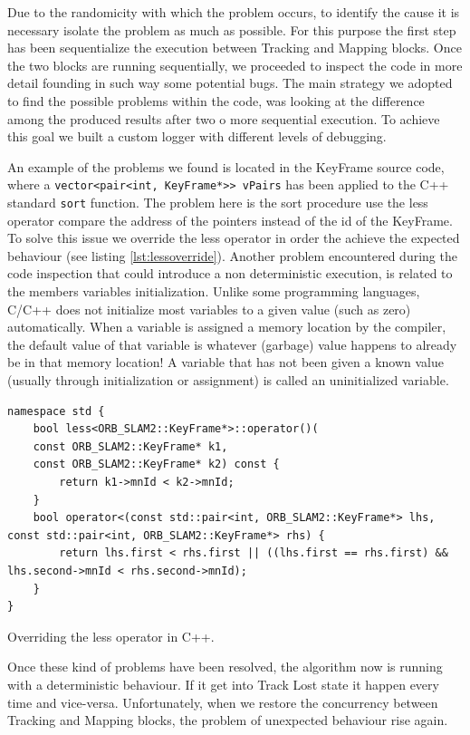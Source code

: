 Due to the randomicity with which the problem occurs, to identify the cause it is necessary isolate the problem as much as possible. For this purpose the first step has been sequentialize the execution between Tracking and Mapping blocks.
Once the two blocks are running sequentially, we proceeded to inspect the code in more detail founding in such way some potential bugs.
The main strategy we adopted to find the possible problems within the code, was looking at the difference among the produced results after two o more sequential execution. To achieve this goal we built a custom logger with different levels of debugging.

An example of the problems we found is located in the KeyFrame source code, where a \texttt{vector<pair<int, KeyFrame*>> vPairs} has been applied to the C++ standard \texttt{sort} function. The problem here is the sort procedure use the less operator compare the address of the pointers instead of the id of the KeyFrame.
To solve this issue we override the less operator in order the achieve the expected behaviour (see listing \ref{lst:lessoverride}).
Another problem encountered during the code inspection that could introduce a non deterministic execution, is related to the members variables initialization.
Unlike some programming languages, C/C++ does not initialize most variables to a given value (such as zero) automatically. When a variable is assigned a memory location by the compiler, the default value of that variable is whatever (garbage) value happens to already be in that memory location! A variable that has not been given a known value (usually through initialization or assignment) is called an uninitialized variable.

\begin{listing}[tbp]
\begin{verbatim}
namespace std {
    bool less<ORB_SLAM2::KeyFrame*>::operator()(
    const ORB_SLAM2::KeyFrame* k1,
    const ORB_SLAM2::KeyFrame* k2) const {
        return k1->mnId < k2->mnId;
    }
    bool operator<(const std::pair<int, ORB_SLAM2::KeyFrame*> lhs, const std::pair<int, ORB_SLAM2::KeyFrame*> rhs) {
        return lhs.first < rhs.first || ((lhs.first == rhs.first) && lhs.second->mnId < rhs.second->mnId);
    }
}
\end{verbatim} 
\caption{Overriding the less operator in C++.}
\label{lst:lessoverride}
\end{listing}

Once these kind of problems have been resolved, the algorithm now is running with a deterministic behaviour. If it get into Track Lost state it happen every time and vice-versa. Unfortunately, when we restore the concurrency between Tracking and Mapping blocks, the problem of unexpected behaviour rise again.

